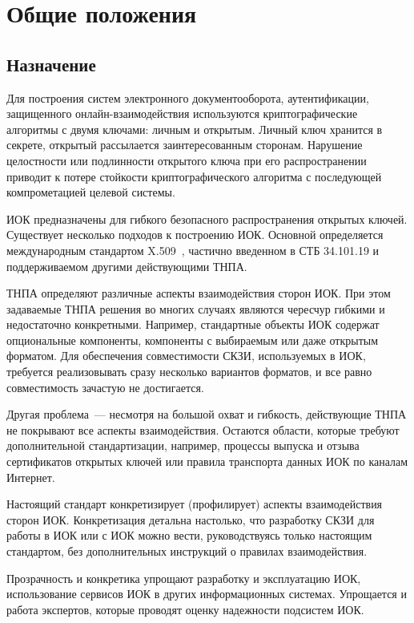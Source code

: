 \chapter{Общие положения}\label{COMMON}

\section{Назначение}

Для построения систем электронного документооборота, 
аутентификации, защищенного онлайн-взаимодействия
используются криптографические алгоритмы с двумя ключами:
личным и открытым. Личный ключ хранится в секрете, открытый 
рассылается заинтересованным сторонам. Нарушение целостности или подлинности 
открытого ключа при его распространении приводит к потере стойкости 
криптографического алгоритма с последующей компрометацией целевой системы.

ИОК предназначены для гибкого безопасного распространения открытых ключей.
Существует несколько подходов к построению ИОК. Основной 
определяется международным стандартом X.509~\cite{X509}, 
частично введенном в СТБ 34.101.19 и поддерживаемом другими действующими ТНПА. 

ТНПА определяют различные аспекты взаимодействия сторон ИОК.
При этом задаваемые ТНПА решения во многих случаях являются чересчур 
гибкими и недостаточно конкретными. Например, стандартные объекты ИОК
содержат опциональные компоненты, компоненты с выбираемым или даже 
открытым форматом. Для обеспечения совместимости СКЗИ, используемых в ИОК, 
требуется реализовывать сразу несколько вариантов форматов,
и все равно совместимость зачастую не достигается. 

Другая проблема~--- несмотря на большой охват и гибкость, действующие ТНПА 
не покрывают все аспекты взаимодействия. Остаются области, 
которые требуют дополнительной стандартизации, например, процессы 
выпуска и отзыва сертификатов открытых ключей или правила транспорта данных 
ИОК по каналам Интернет. 
%

Настоящий стандарт конкретизирует (профилирует) аспекты взаимодействия 
сторон ИОК. Конкретизация детальна настолько, что разработку СКЗИ 
для работы в ИОК или с ИОК можно вести, руководствуясь только 
настоящим стандартом, без дополнительных инструкций о правилах 
взаимодействия.

Прозрачность и конкретика упрощают разработку и эксплуатацию ИОК,
использование сервисов ИОК в других информационных системах.
Упрощается и работа экспертов, которые проводят оценку надежности подсистем ИОК.

